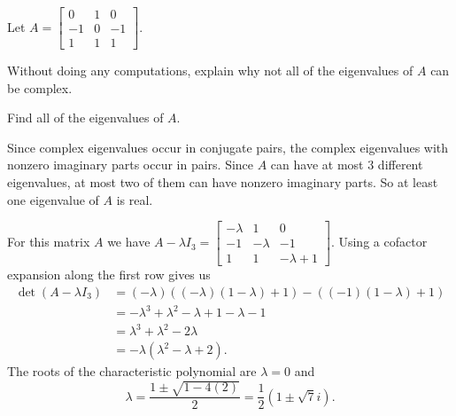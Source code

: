 
\ExampleIntro

\begin{example} Let $A = \left[ \begin{array}{rcr} 0&1&0 \\ -1&0&-1 \\ 1&1&1 \end{array} \right]$.
\ba
\item Without doing any computations, explain why not all of the eigenvalues of $A$ can be complex.

\item Find all of the eigenvalues of $A$.

\ea

\ExampleSolution
\ba
\item Since complex eigenvalues occur in conjugate pairs, the complex eigenvalues with nonzero imaginary parts occur in pairs. Since $A$ can have at most 3 different eigenvalues, at most two of them can have nonzero imaginary parts. So at least one eigenvalue of $A$ is real. 

\item For this matrix $A$ we have $A - \lambda I_3 = \left[ \begin{array}{rrc} -\lambda&1&0 \\ -1&-\lambda&-1 \\ 1&1&-\lambda+1 \end{array} \right]$. Using a cofactor expansion along the first row gives us 
\begin{align*}
\det(A - \lambda I_3) &= (-\lambda)\left((-\lambda)(1-\lambda)+1\right) - \left((-1)(1-\lambda)+1\right) \\
	&= -\lambda^3 + \lambda^2 - \lambda +1 - \lambda -1 \\
	&= \lambda^3 + \lambda^2 - 2\lambda \\
	&= -\lambda(\lambda^2 -\lambda + 2).
\end{align*}
The roots of the characteristic polynomial are $\lambda = 0$ and 
\[\lambda = \frac{1 \pm \sqrt{1-4(2)}}{2} = \frac{1}{2}(1 \pm \sqrt{7}i).\]


\ea


\end{example}

